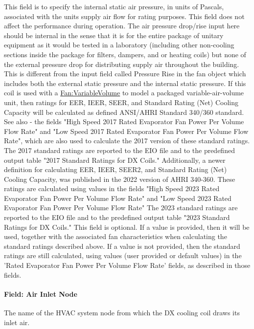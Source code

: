 This field is to specify the internal static air pressure, in units of Pascals, associated with the units supply air flow for rating purposes. This field does not affect the performance during operation. The air pressure drop/rise input here should be internal in the sense that it is for the entire package of unitary equipment as it would be tested in a laboratory (including other non-cooling sections inside the package for filters, dampers, and or heating coils) but none of the external pressure drop for distributing supply air throughout the building. This is different from the input field called Pressure Rise in the fan object which includes both the external static pressure and the internal static pressure.
If this coil is used with a \hyperref[fanvariablevolume]{Fan:VariableVolume} to model a packaged variable-air-volume unit, then ratings for  EER, IEER, SEER, and Standard Rating (Net) Cooling Capacity will be calculated as defined ANSI/AHRI Standard 340/360 standard.  See also - the fields "High Speed 2017 Rated Evaporator Fan Power Per Volume Flow Rate" and "Low Speed 2017 Rated Evaporator Fan Power Per Volume Flow Rate", which are also used to calculate the 2017 version of these standard ratings. The 2017 standard ratings are reported to the EIO file and to the predefined output table "2017 Standard Ratings for DX Coils."
Additionally, a newer definition for calculating EER, IEER, SEER2, and Standard Rating (Net) Cooling Capacity, was published in the 2022 version of AHRI 340-360.  These ratings are calculated using values in the fields "High Speed 2023 Rated Evaporator Fan Power Per Volume Flow Rate" and "Low Speed 2023 Rated Evaporator Fan Power Per Volume Flow Rate"  The 2023 standard ratings are reported to the EIO file and to the predefined output table "2023 Standard Ratings for DX Coils." This field is optional. If a value is provided, then it will be used, together with the associated fan characteristics when calculating the standard ratings described above. If a value is not provided, then the standard ratings are still calculated, using values (user provided or default values) in the 'Rated Evaporator Fan Power Per Volume Flow Rate' fields, as described in those fields.

\paragraph{Field: Air Inlet Node}\label{field-air-inlet-node}

The name of the HVAC system node from which the DX cooling coil draws its inlet air.

